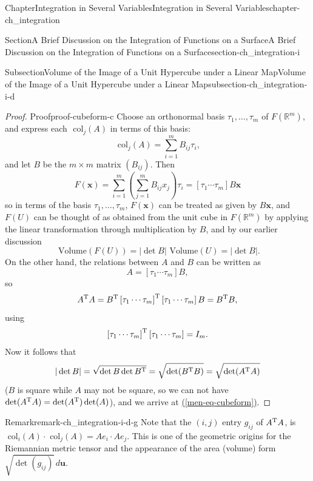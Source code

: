 \documentclass[oneside,10pt,]{book}
\newcommand{\xreffont}{\relax}
\numberwithin{equation}{section}
\newcommand{\bu}{\mathbf{u}}
\newcommand{\bx}{\mathbf{x}}
\begin{document}
\begin{chapterptx}{Chapter}{Integration in Several Variables}{}{Integration in Several Variables}{}{}{chapter-ch_integration}
\begin{sectionptx}{Section}{A Brief Discussion on the Integration of Functions on a Surface}{}{A Brief Discussion on the Integration of Functions on a Surface}{}{}{section-ch_integration-i}
\begin{subsectionptx}{Subsection}{Volume of the Image of a Unit Hypercube under a Linear Map}{}{Volume of the Image of a Unit Hypercube under a Linear Map}{}{}{subsection-ch_integration-i-d}
\begin{proof}{Proof}{}{proof-cubeform-c}
Choose an orthonormal basis \(\tau_1,\ldots, \tau_m\) of \(F(\mathbb R^m)\), and express each  \(\text{ col}_j(A)\) in terms of this  basis:%
\begin{equation*}
\text{ col}_j(A)=\sum_{i=1}^m B_{ij}\tau_i,
\end{equation*}
and let \(B\) be the \(m\times m\) matrix \((B_{ij})\). Then%
\begin{equation*}
F(\bx) =\sum_{i=1}^m \left( \sum_{j=1}^mB_{ij}x_{j}\right) \tau_i =\left[\tau_1 \cdots \tau_m\right] B\bx
\end{equation*}
so in terms of the basis \(\tau_1,\ldots, \tau_m\), \(F(\bx)\) can be treated as given by \(B\bx\), and \(F(U)\) can be thought of as obtained from the unit cube  in \(F(\mathbb R^m)\) by applying the linear transformation through multiplication by \(B\), and by our earlier discussion%
\begin{equation*}
\text{ Volume} (F(U)) = |\det B | \text{ Volume}(U)=|\det B |.
\end{equation*}
On the other hand, the relations between \(A\) and \(B\) can be written as%
\begin{equation*}
A= \left[\tau_1 \cdots \tau_m\right] B,
\end{equation*}
so%
\begin{equation*}
A^{\rm T}A=B^{\rm T} \left[\tau_1 \cdots \tau_m\right]^{\rm T} \left[\tau_1 \cdots \tau_m \right] B
= B^{\rm T}B,
\end{equation*}
using%
\begin{equation*}
\left[\tau_1 \cdots \tau_m\right]^{\rm T} \left[\tau_1 \cdots \tau_m \right] = I_m.
\end{equation*}
Now it follows that%
\begin{equation*}
|\det B |= \sqrt {\det B \det B^{\rm T}} =  \sqrt {\det (B^{\rm T}B)}= \sqrt {\det (A^{\rm T}A)}
\end{equation*}
(\(B\) is square while \(A\) may not be square, so we can not have \(\det (A^{\rm T}A)=\det (A^{\rm T})\det (A)\)), and we arrive at \hyperref[men-eq-cubeform]{({\xreffont\ref{men-eq-cubeform}})}.\end{proof}
\begin{remark}{Remark}{}{remark-ch_integration-i-d-g}%
Note that the \((i, j)\) entry \(g_{ij}\) of \(A^{\rm T}A\), is \(\text{ col}_i (A) \cdot \text{ col}_j (A)= Ae_i \cdot Ae_j\). This is one of the geometric origins for the Riemannian metric tensor and the appearance of the area (volume) form \(\sqrt {\det (g_{ij})}\, d\bu\).%
\par

\end{remark}
\end{subsectionptx}
\end{sectionptx}
\end{chapterptx}
\end{document}
